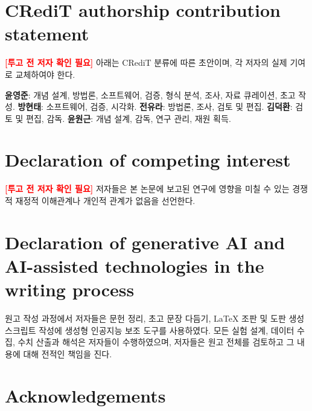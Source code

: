 %

\section*{CRediT authorship contribution statement}

\textcolor{red}{\textbf{[투고 전 저자 확인 필요]}} 아래는 CRediT 분류에 따른 초안이며,
각 저자의 실제 기여로 교체하여야 한다.

\noindent
\textbf{윤영준}: 개념 설계, 방법론, 소프트웨어, 검증, 형식 분석, 조사, 자료 큐레이션,
초고 작성. \textbf{방현태}: 소프트웨어, 검증, 시각화. \textbf{전유라}: 방법론, 조사,
검토 및 편집. \textbf{김덕환}: 검토 및 편집, 감독. \textbf{윤원근}: 개념 설계, 감독,
연구 관리, 재원 획득.

\section*{Declaration of competing interest}

\textcolor{red}{\textbf{[투고 전 저자 확인 필요]}}
저자들은 본 논문에 보고된 연구에 영향을 미칠 수 있는 경쟁적 재정적 이해관계나 개인적 관계가
없음을 선언한다.

\section*{Declaration of generative AI and AI-assisted technologies in the writing process}

원고 작성 과정에서 저자들은 문헌 정리, 초고 문장 다듬기, \LaTeX{} 조판 및 도판 생성
스크립트 작성에 생성형 인공지능 보조 도구를 사용하였다. 모든 실험 설계, 데이터 수집,
수치 산출과 해석은 저자들이 수행하였으며, 저자들은 원고 전체를 검토하고 그 내용에 대해
전적인 책임을 진다.

\section*{Acknowledgements}

